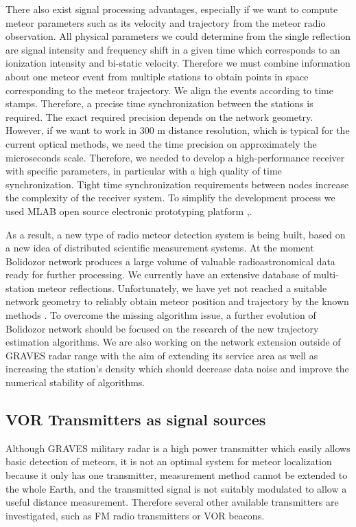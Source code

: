 \documentclass[twoside]{ctuthesis}
\theoremstyle{plain}
\theoremstyle{definition}
\theoremstyle{note}
\begin{document}
There also exist signal processing advantages, especially if we want to compute meteor parameters such as its velocity and trajectory from the meteor radio observation. All physical parameters we could determine from the single reflection are signal intensity and frequency shift in a given time which corresponds to an ionization intensity and bi-static velocity.
Therefore we must combine information about one meteor event from multiple stations to obtain points in space corresponding to the meteor trajectory. We align the events according to time stamps. Therefore, a precise time synchronization between the stations is required. The exact required precision depends on the network geometry. However, if we want to work in 300 m distance resolution, which is typical for the current optical methods, we need the time precision on approximately the microseconds scale. Therefore, we needed to develop a high-performance receiver with specific parameters, in particular with a high quality of time synchronization. Tight time synchronization requirements between nodes increase the complexity of the receiver system. To simplify the development process we used MLAB open source electronic prototyping platform \cite{Bolidozor},\cite{MLAB}.

As a result, a new type of radio meteor detection system is being built, based on a new idea of distributed scientific measurement systems. At the moment Bolidozor network produces a large volume of valuable radioastronomical data ready for further processing.  
We currently have an extensive database of multi-station meteor reflections. Unfortunately, we have yet not reached a suitable network geometry to reliably obtain meteor position and trajectory by the known methods \cite{Doppler_method}. 
To overcome the missing algorithm issue, a further evolution of Bolidozor network should be focused on the research of the new trajectory estimation algorithms. We are also working on the network extension outside of GRAVES radar range with the aim of extending its service area as well as increasing the station's density which should decrease data noise and improve the numerical stability of algorithms. 

\subsection{VOR Transmitters as signal sources}
Although GRAVES military radar is a high power transmitter which easily allows basic detection of meteors, it is not an optimal system for meteor localization because it only has one transmitter, measurement method cannot be extended to the whole Earth, and the transmitted signal is not suitably modulated to allow a useful distance measurement.  Therefore several other available transmitters are investigated, such as FM radio transmitters or VOR beacons. 
\end{document}
